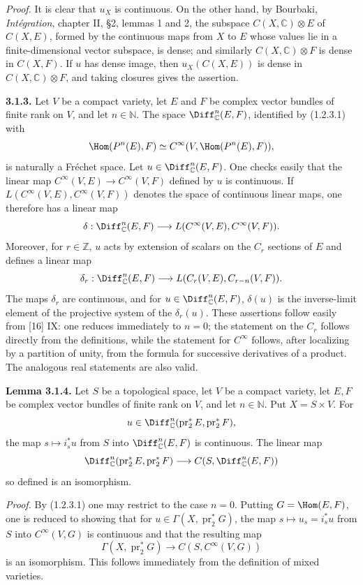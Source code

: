 \documentclass[11pt]{article}
\begin{document}
\emph{Proof.} It is clear that $u_X$ is continuous. On the other hand, by Bourbaki, \emph{Intégration}, chapter II, §2, lemmas 1 and 2, the subspace $C(X,\mathbb C)\otimes E$ of $C(X,E)$, formed by the continuous maps from $X$ to $E$ whose values lie in a finite-dimensional vector subspace, is dense; and similarly $C(X,\mathbb C)\otimes F$ is dense in $C(X,F)$. If $u$ has dense image, then $u_X(C(X,E))$ is dense in $C(X,\mathbb C)\otimes F$, and taking closures gives the assertion.

\textbf{3.1.3.} Let $V$ be a compact variety, let $E$ and $F$ be complex vector bundles of finite rank on $V$, and let $n\in\mathbb N$. The space $\Diff^n_{\mathbb C}(E,F)$, identified by (1.2.3.1) with
\[
 \Hom(P^n(E),F)\simeq C^\infty(V,\Hom(P^n(E),F)),
\]
is naturally a Fréchet space. Let $u\in\Diff^n_{\mathbb C}(E,F)$. One checks easily that the linear map $C^\infty(V,E)\to C^\infty(V,F)$ defined by $u$ is continuous. If $L(C^\infty(V,E),C^\infty(V,F))$ denotes the space of continuous linear maps, one therefore has a linear map
\[
 \delta:\Diff^n_{\mathbb C}(E,F)
 \longrightarrow L(C^\infty(V,E),C^\infty(V,F)).
\]
Moreover, for $r\in\mathbb Z$, $u$ acts by extension of scalars on the $C_r$ sections of $E$ and defines a linear map
\[
 \delta_r:\Diff^n_{\mathbb C}(E,F)
 \longrightarrow L(C_r(V,E),C_{r-n}(V,F)).
\]
The maps $\delta_r$ are continuous, and for $u\in\Diff^n_{\mathbb C}(E,F)$, $\delta(u)$ is the inverse-limit element of the projective system of the $\delta_r(u)$. These assertions follow easily from [16] IX: one reduces immediately to $n=0$; the statement on the $C_r$ follows directly from the definitions, while the statement for $C^\infty$ follows, after localizing by a partition of unity, from the formula for successive derivatives of a product. The analogous real statements are also valid.

\textbf{Lemma 3.1.4.} Let $S$ be a topological space, let $V$ be a compact variety, let $E,F$ be complex vector bundles of finite rank on $V$, and let $n\in\mathbb N$. Put $X=S\times V$. For
\[
 u\in\Diff^n_{\mathbb C}(\operatorname{pr}_2^*E,\operatorname{pr}_2^*F),
\]
the map $s\mapsto i_s^*u$ from $S$ into $\Diff^n_{\mathbb C}(E,F)$ is continuous. The linear map
\[
 \Diff^n_{\mathbb C}(\operatorname{pr}_2^*E,\operatorname{pr}_2^*F)
 \longrightarrow C(S,\Diff^n_{\mathbb C}(E,F))
\]
so defined is an isomorphism.

\emph{Proof.} By (1.2.3.1) one may restrict to the case $n=0$. Putting $G=\Hom(E,F)$, one is reduced to showing that for $u\in\Gamma(X,\operatorname{pr}_2^*G)$, the map $s\mapsto u_s=i_s^*u$ from $S$ into $C^\infty(V,G)$ is continuous and that the resulting map
\[
 \Gamma(X,\operatorname{pr}_2^*G)\longrightarrow C(S,C^\infty(V,G))
\]
is an isomorphism. This follows immediately from the definition of mixed varieties.
\end{document}
